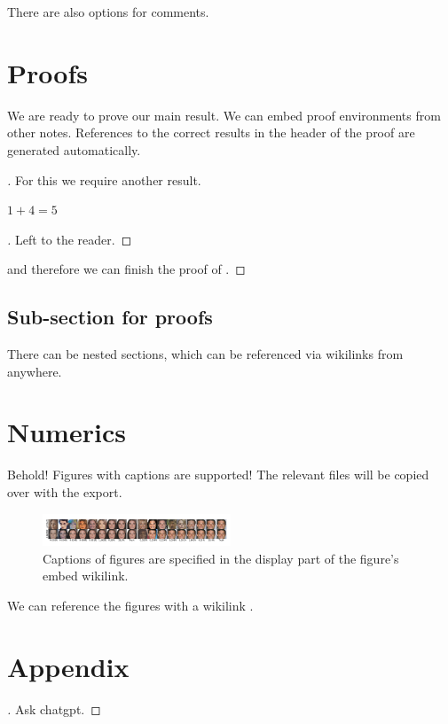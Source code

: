 \documentclass{article}
\begin{document}
There are also options for comments.
\section{Proofs}
\label{loc:body.proofs}
We are ready to prove our main result. We can embed proof environments from other notes. References to the correct results in the header of the proof are generated automatically.
\begin{proof}[\hypertarget{loc:theorem_1.proof}Proof of \Cref{loc:theorem_1.statement}]

For this we require another result.
\begin{proposition}

\label{loc:lemma_2.statement}
$1+4 = 5$
\end{proposition}
\begin{proof}[\hypertarget{loc:lemma_2.proof}Proof of \Cref{loc:lemma_2.statement}]

Left to the reader.
\end{proof}
and therefore we can finish the proof of .
\end{proof}
\subsection{Sub-section for proofs}
\label{loc:body.proofs.sub:section_for_proofs}
There can be nested sections, which can be referenced via wikilinks from anywhere.
\section{Numerics}
\label{loc:body.numerics}
Behold! Figures with captions are supported! The relevant files will be copied over with the export.
\begin{figure}[h]
\centering
\includegraphics[width=0.5\textwidth]{Files/intro_comp_wlabel.pdf}
\caption{Captions of figures are specified in the display part of the figure's embed wikilink.\label{fig:intro_comp_wlabel.pdf}}
\end{figure}
We can reference the figures with a wikilink .
\printbibliography
\appendix
\section{Appendix}
\begin{proof}[\hypertarget{loc:lemma_1.proof}Proof of \Cref{loc:lemma_1.statement}]

Ask chatgpt.
\end{proof}
\end{document}

